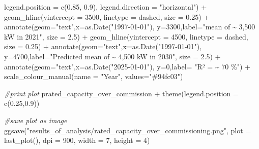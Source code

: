 \documentclass[a4paper,11pt]{article}
\newenvironment{Shaded}{\begin{snugshade}}{\end{snugshade}}
\newcommand{\AttributeTok}[1]{\textcolor[rgb]{0.77,0.63,0.00}{#1}}
\newcommand{\CommentTok}[1]{\textcolor[rgb]{0.56,0.35,0.01}{\textit{#1}}}
\newcommand{\DecValTok}[1]{\textcolor[rgb]{0.00,0.00,0.81}{#1}}
\newcommand{\FloatTok}[1]{\textcolor[rgb]{0.00,0.00,0.81}{#1}}
\newcommand{\FunctionTok}[1]{\textcolor[rgb]{0.00,0.00,0.00}{#1}}
\newcommand{\NormalTok}[1]{#1}
\newcommand{\SpecialCharTok}[1]{\textcolor[rgb]{0.00,0.00,0.00}{#1}}
\newcommand{\StringTok}[1]{\textcolor[rgb]{0.31,0.60,0.02}{#1}}
\begin{document}
\begin{Shaded}
\begin{Highlighting}[]
         \AttributeTok{legend.position =} \FunctionTok{c}\NormalTok{(}\FloatTok{0.85}\NormalTok{, }\FloatTok{0.9}\NormalTok{),}
         \AttributeTok{legend.direction =} \StringTok{"horizontal"}\NormalTok{) }\SpecialCharTok{+}
  \FunctionTok{geom\_hline}\NormalTok{(}\AttributeTok{yintercept =} \DecValTok{3500}\NormalTok{, }\AttributeTok{linetype =} \StringTok{\textquotesingle{}dashed\textquotesingle{}}\NormalTok{, }\AttributeTok{size =} \FloatTok{0.25}\NormalTok{) }\SpecialCharTok{+}
  \FunctionTok{annotate}\NormalTok{(}\AttributeTok{geom=}\StringTok{"text"}\NormalTok{,}\AttributeTok{x=}\FunctionTok{as.Date}\NormalTok{(}\StringTok{"1997{-}01{-}01"}\NormalTok{),}
           \AttributeTok{y=}\DecValTok{3300}\NormalTok{,}\AttributeTok{label=}\StringTok{"mean of \textasciitilde{} 3,500 kW in 2021"}\NormalTok{, }\AttributeTok{size =} \FloatTok{2.5}\NormalTok{) }\SpecialCharTok{+}
  \FunctionTok{geom\_hline}\NormalTok{(}\AttributeTok{yintercept =} \DecValTok{4500}\NormalTok{, }\AttributeTok{linetype =} \StringTok{\textquotesingle{}dashed\textquotesingle{}}\NormalTok{, }\AttributeTok{size =} \FloatTok{0.25}\NormalTok{) }\SpecialCharTok{+}
  \FunctionTok{annotate}\NormalTok{(}\AttributeTok{geom=}\StringTok{"text"}\NormalTok{,}\AttributeTok{x=}\FunctionTok{as.Date}\NormalTok{(}\StringTok{"1997{-}01{-}01"}\NormalTok{),}
           \AttributeTok{y=}\DecValTok{4700}\NormalTok{,}\AttributeTok{label=}\StringTok{"Predicted mean of \textasciitilde{} 4,500 kW in 2030"}\NormalTok{, }\AttributeTok{size =} \FloatTok{2.5}\NormalTok{) }\SpecialCharTok{+}
  \FunctionTok{annotate}\NormalTok{(}\AttributeTok{geom=}\StringTok{"text"}\NormalTok{,}\AttributeTok{x=}\FunctionTok{as.Date}\NormalTok{(}\StringTok{"2025{-}01{-}01"}\NormalTok{),}
           \AttributeTok{y=}\DecValTok{0}\NormalTok{,}\AttributeTok{label=} \StringTok{"R² = \textasciitilde{} 70 \%"}\NormalTok{) }\SpecialCharTok{+}
  \FunctionTok{scale\_colour\_manual}\NormalTok{(}\AttributeTok{name =} \StringTok{"Year"}\NormalTok{, }\AttributeTok{values=}\StringTok{"\#94fc03"}\NormalTok{) }

\CommentTok{\#print plot}
\NormalTok{prated\_capacity\_over\_commission }\SpecialCharTok{+}  \FunctionTok{theme}\NormalTok{(}\AttributeTok{legend.position =} \FunctionTok{c}\NormalTok{(}\FloatTok{0.25}\NormalTok{,}\FloatTok{0.9}\NormalTok{))}

\CommentTok{\#save plot as image}
\FunctionTok{ggsave}\NormalTok{(}\StringTok{"results\_of\_analysis/rated\_capacity\_over\_commissioning.png"}\NormalTok{,}
       \AttributeTok{plot =} \FunctionTok{last\_plot}\NormalTok{(),}
       \AttributeTok{dpi =} \DecValTok{900}\NormalTok{,}
       \AttributeTok{width =} \DecValTok{7}\NormalTok{,}
       \AttributeTok{height =} \DecValTok{4}\NormalTok{)}


\end{Highlighting}
\end{Shaded}
\end{document}
